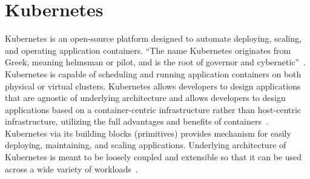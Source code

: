 \section{Kubernetes}

Kubernetes is an open-source platform designed to automate deploying,
scaling, and operating application containers. ``The name Kubernetes
originates from Greek, meaning helmsman or pilot, and is the root of
governor and cybernetic''~\cite{hid-sp18-510-web-Kubernetes}.
Kubernetes is capable of scheduling and running application containers
on both physical or virtual clusters. Kubernetes allows developers to
design applications that are agnostic of underlying architecture and
allows developers to design applications based on a container-centric
infrastructure rather than host-centric infrastructure, utilizing the
full advantages and benefits of
containers~\cite{hid-sp18-510-med-Kubernetes}. Kubernetes via its
building blocks (primitives) provides mechanism for easily deploying,
maintaining, and scaling applications. Underlying architecture of
Kubernetes is meant to be loosely coupled and extensible so that it
can be used across a wide variety of
workloads~\cite{hid-sp18-510-wiki-Kubernetes}.
